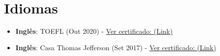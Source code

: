 \documentclass[letterpaper,11pt]{article}%
\begin{document}
\section*{Idiomas}%
\label{sec:Idiomas}%
\begin{itemize}[leftmargin=0.15in, label={}]%
\item%
\textbf{Inglês}: TOEFL (Out 2020) - \href{http://robertomdiniz.s3-website-us-east-1.amazonaws.com/accomplishments/english_TOEFL_my_score.pdf}{Ver certificado: (Link)}%
\item%
\textbf{Inglês}: Casa Thomas Jefferson (Set 2017) - \href{http://robertomdiniz.s3-website-us-east-1.amazonaws.com/accomplishments/english_Casa%20Thomas%20Jefferson.pdf}{Ver certificado: (Link)}%
\end{itemize}

%
\end{document}
